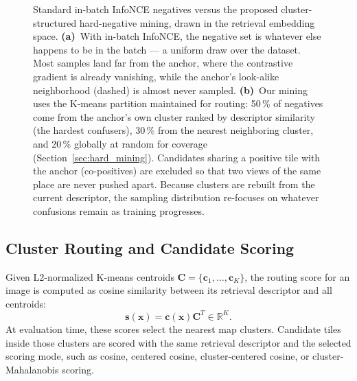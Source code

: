 \documentclass[conference]{IEEEtran}
\begin{document}
\begin{figure}[htbp]
{\begin{tikzpicture}
\end{tikzpicture}%
}
\caption{Standard in-batch InfoNCE negatives versus the proposed
cluster-structured hard-negative mining, drawn in the retrieval embedding
space. \textbf{(a)}~With in-batch InfoNCE, the negative set is whatever else
happens to be in the batch — a uniform draw over the dataset. Most samples
land far from the anchor, where the contrastive gradient is already
vanishing, while the anchor's look-alike neighborhood (dashed) is almost
never sampled. \textbf{(b)}~Our mining uses the K-means partition maintained
for routing: 50\,\% of negatives come from the anchor's own cluster ranked by
descriptor similarity (the hardest confusers), 30\,\% from the nearest
neighboring cluster, and 20\,\% globally at random for coverage
(Section~\ref{sec:hard_mining}). Candidates sharing a positive tile with the
anchor (co-positives) are excluded so that two views of the same place are
never pushed apart. Because clusters are rebuilt from the current descriptor,
the sampling distribution re-focuses on whatever confusions remain as
training progresses.}
\label{fig:mining_comparison}
\end{figure}

\subsection{Cluster Routing and Candidate Scoring}
Given L2-normalized K-means centroids
$\mathbf{C}=\{\mathbf{c}_1,\ldots,\mathbf{c}_{K}\}$, the routing score for an
image is computed as cosine similarity between its retrieval descriptor and all
centroids:
\begin{equation}
    \mathbf{s}(\mathbf{x}) =
    \mathbf{c}(\mathbf{x})\mathbf{C}^{T}\in\mathbb{R}^{K}.
\end{equation}
At evaluation time, these scores select the nearest map clusters. Candidate
tiles inside those clusters are scored with the same retrieval
descriptor and the selected scoring mode, such as cosine, centered cosine,
cluster-centered cosine, or cluster-Mahalanobis scoring.
\end{document}
